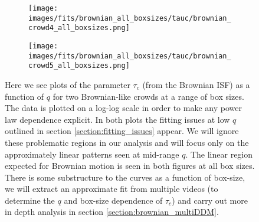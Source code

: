 \documentclass[10pt]{article}
\begin{document}
\begin{figure}[H]
\begin{subfigure}[t]{.5\textwidth}
  \centering
 \texttt{[image: images/fits/brownian\_all\_boxsizes/tauc/brownian\_crowd4\_all\_boxsizes.png]}
  \caption{}
\end{subfigure}%
\hfill
\begin{subfigure}[t]{.5\textwidth}
  \centering
  \texttt{[image: images/fits/brownian\_all\_boxsizes/tauc/brownian\_crowd5\_all\_boxsizes.png]}
  \caption{}
\end{subfigure}
\caption{Here we see plots of the parameter $\tau_c$ (from the Brownian ISF) as a function of $q$ for two Brownian-like crowds at a range of box sizes. The data is plotted on a log-log scale in order to make any power law dependence explicit. In both plots the fitting issues at low $q$ outlined in section \ref{section:fitting_issues} appear. We will ignore these problematic regions in our analysis and will focus only on the approximately linear patterns seen at mid-range $q$. The linear region expected for Brownian motion is seen in both figures at all box sizes. There is some substructure to the curves as a function of box-size, we will extract an approximate fit from multiple videos (to determine the $q$ and box-size dependence of $\tau_c$) and carry out more in depth analysis in section \ref{section:brownian_multiDDM}.}
\label{fig:crowd_brownian_fits_tauc_all_boxsizes}
\end{figure}
\end{document}
